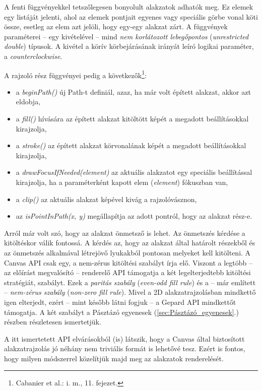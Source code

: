 \documentclass[12pt]{report}
\theoremstyle{definition}
\newcommand{\inenglish}[1]{\textsl{#1}}
\newcommand{\func}[1]{{\textsl{#1}}}
\begin{document}
A fenti függvényekkel tetszőlegesen bonyolult alakzatok adhatók meg. Ez elemek
egy listáját jelenti, ahol az elemek pontjait egyenes vagy speciális görbe
vonal köti össze, esetleg az elem azt jelöli, hogy egy-egy alakzat zárt. A
függvények paraméterei -- egy kivételével -- mind \emph{nem korlátozott
lebegőpontos} (\func{unrestricted double}) típusok. A kivétel a körív
körbejárásának irányát leíró logikai paraméter, a \func{counterclockwise}.

A rajzoló rész függvényei pedig a következők\footnote{Cabanier et al.: i.
m., 11. fejezet.}:
\begin{itemize}
  \item a \func{beginPath()} új Path-t definiál, azaz, ha már volt épített
  alakzat, akkor azt eldobja,
  \item a \func{fill()} hívására az épített alakzat kitöltött képét a megadott
  beállításokkal kirajzolja,
  \item a \func{stroke()} az épített alakzat körvonalának képét a megadott
  beállításokkal kirajzolja,
  \item a \func{drawFocusIfNeeded(element)} az aktuális alakzatot egy speciális
  beállítással kirajzolja, ha a paraméterként kapott elem (\func{element})
  fókuszban van,
  \item a \func{clip()} az aktuális alakzat képével kivág a rajzolóvásznon,
  \item az \func{isPointInPath(x, y)} megállapítja az adott pontról, hogy az
  alakzat rész-e.
\end{itemize}

Arról már volt szó, hogy az alakzat önmetsző is lehet. Az önmetszés kérdése a
kitöltéskor válik fontossá. A kérdés az, hogy az alakzat által határolt
részekből és az önmetszés alkalmával létrejövő lyukakból pontosan melyeket kell
kitölteni. A Canvas API csak egy, a nem-zérus kitöltési szabályt írja elő.
Viszont a legtöbb -- az előírást megvalósító -- renderelő API támogatja a két
legelterjedtebb kitöltési stratégiát, szabályt. Ezek a \emph{paritás szabály}
(\inenglish{even-odd fill rule}) és a -- már említett -- \emph{nem-zérus szabály}
(\inenglish{non-zero fill rule}). Mivel a 2D alakzatrajzolásban mindkettő igen
elterjedt, ezért -- mint később látni fogjuk -- a Gepard API mindkettőt
támogatja. A két szabályt a Pásztázó egyenesek (\ref{sec:Pásztázó_egyenesek}.)
részben részletesen ismertetjük.

A itt ismertetett API elvárásokból (is) látszik, hogy a Canvas által
biztosított alakzatrajzolás jó néhány nem triviális formát is lehetővé tesz.
Ezért is fontos, hogy milyen módszerrel közelítjük majd meg az alakzatok
renderelését.
\end{document}
